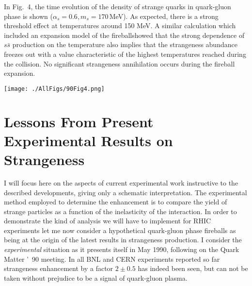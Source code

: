 \begin{mdframed}[linecolor=gray,roundcorner=12pt,backgroundcolor=Dandelion!15,linewidth=1pt,leftmargin=0cm,rightmargin=0cm,topline=true,bottomline=true,skipabove=12pt]
In Fig.~4, the time evolution of the density of strange quarks in quark-gluon phase is shown ($\alpha_s = 0.6, m_s = 170$\,MeV). As expected, there is a strong threshold effect at temperatures around 150 MeV. A similar calculation which included an expansion model of the fireball\footnotemark[5] showed that the strong dependence of $s\bar s$ production on the temperature also implies that the strangeness abundance freezes out with a value characteristic of the highest temperatures reached during the collision. No significant strangeness annihilation occurs during the fireball expansion. 
 


\centerline{
\texttt{[image: ./AllFigs/90Fig4.png]}
}
 

\section*{Lessons From Present Experimental Results on Strangeness}
I will focus here on the aspects of current experimental work instructive to the described developments, giving only a schematic interpretation. The experimental method employed to determine the enhancement is to compare the yield of strange particles as a function of the inelasticity of the interaction. In order to demonstrate the kind of analysis we will have to implement for RHIC experiments let me now consider a hypothetical quark-gluon phase fireballs as being at the origin of the latest results in strangeness production. I consider the {\it experimental} situation as it presents itself in May 1990, following on the Quark Matter \rq\ 90 meeting. In all BNL and CERN experiments reported so far strangeness enhancement by a factor $2\pm 0.5$ has indeed been seen, but can not be taken without prejudice to be a signal of quark-gluon plasma.  


\end{mdframed}
